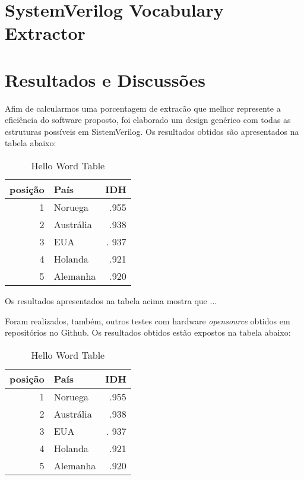 \documentclass[12pt, twocolumn, a4paper]{article}
\begin{document}
	\section{SystemVerilog Vocabulary Extractor}
	\section{Resultados e Discussões}
\quad Afim de calcularmos uma porcentagem de extracão que melhor represente a eficiência do software proposto, foi elaborado um design genérico com todas as estruturas possíveis em SistemVerilog. Os resultados obtidos são apresentados na tabela abaixo:

\begin{table}[h]
\centering
\caption{Hello Word Table}
	\begin{tabular}{r|l|r}
	\hline
	posição & País & IDH\\
	\hline
	1 & Noruega        & .955 \\
	\hline
	2 & Austrália 	   & .938 \\
	\hline
	3 & EUA            &. 937 \\
	\hline
	4 & Holanda        & .921 \\
	\hline
	5 & Alemanha       & .920 \\
	\hline
	
	\end{tabular}

\end{table}

\quad Os resultados apresentados na tabela acima mostra que ...

	Foram realizados, também, outros testes com hardware \textit{opensource} obtidos em repositórios no Github. Os resultados obtidos estão expostos na tabela abaixo:
	
	\begin{table}[h]
\centering
\caption{Hello Word Table}
	\begin{tabular}{r|l|r}
	\hline
	posição & País & IDH\\
	\hline
	1 & Noruega        & .955 \\
	\hline
	2 & Austrália 	   & .938 \\
	\hline
	3 & EUA            &. 937 \\
	\hline
	4 & Holanda        & .921 \\
	\hline
	5 & Alemanha       & .920 \\
	\hline
	
	\end{tabular}

\end{table}
	
  
	
	
	
\end{document}
